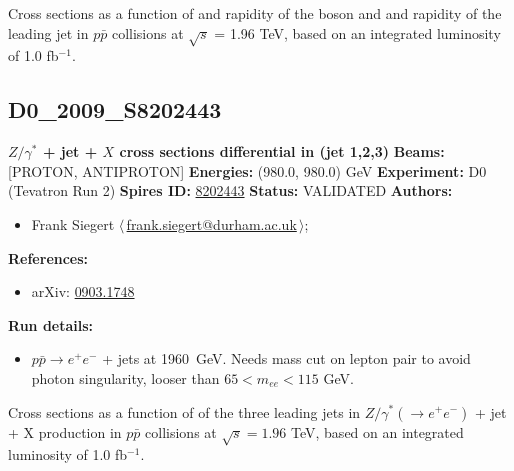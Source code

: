 \noindent Cross sections as a function of \pT and rapidity of the boson and \pT and rapidity of the leading jet in $p \bar{p}$ collisions at $\sqrt{s}$ = 1.96 TeV, based on an integrated luminosity of 1.0 fb$^{-1}$.

\clearpage


\clearpage

\subsection[D0\_2009\_S8202443]{D0\_2009\_S8202443\,\cite{Abazov:2009av}}
\textbf{$Z/\gamma^*$ + jet + $X$ cross sections differential in \pT(jet 1,2,3)}\newline
\textbf{Beams:} [PROTON, ANTIPROTON] \newline
\textbf{Energies:} (980.0, 980.0) GeV \newline
\textbf{Experiment:} D0 (Tevatron Run 2) \newline
\textbf{Spires ID:} \href{http://www.slac.stanford.edu/spires/find/hep/www?rawcmd=key+8202443}{8202443}\newline
\textbf{Status:} VALIDATED\newline
\textbf{Authors:}
\begin{itemize}
  \item Frank Siegert $\langle\,$\href{mailto:frank.siegert@durham.ac.uk}{frank.siegert@durham.ac.uk}$\,\rangle$;
\end{itemize}
\textbf{References:}
\begin{itemize}
  \item arXiv: \href{http://arxiv.org/abs/0903.1748}{0903.1748}
\end{itemize}
\textbf{Run details:}
\begin{itemize}

  \item $p \bar{p} \to e^+ e^-$ + jets at 1960~GeV. Needs mass cut on lepton pair to avoid photon singularity, looser than $65 < m_{ee} < 115$ GeV.\end{itemize}

\noindent Cross sections as a function of \pT of the three leading jets in $Z/\gamma^{*} (\to e^{+} e^{-})$ + jet + X production in $p \bar{p}$ collisions at $\sqrt{s} = 1.96$ TeV, based on an integrated luminosity of 1.0 fb$^{-1}$.

\clearpage


\clearpage

